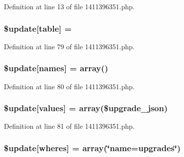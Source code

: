 Definition at line 13 of file 1411396351.\+php.

\subsubsection[{\texorpdfstring{\$update}{$update}}]{\setlength{\rightskip}{0pt plus 5cm}\${\bf update}\mbox{[}\textquotesingle{}table\textquotesingle{}\mbox{]} = \textquotesingle{}}\hypertarget{1411396351_8php_aee7ba5985ddf023a93862ab77e9718f9}{}\label{1411396351_8php_aee7ba5985ddf023a93862ab77e9718f9}


Definition at line 79 of file 1411396351.\+php.

\subsubsection[{\texorpdfstring{\$update}{$update}}]{\setlength{\rightskip}{0pt plus 5cm}\${\bf update}\mbox{[}\textquotesingle{}names\textquotesingle{}\mbox{]} = array(\textquotesingle{})}\hypertarget{1411396351_8php_abcf5ad2e4fef35de04bef0168cc91ddc}{}\label{1411396351_8php_abcf5ad2e4fef35de04bef0168cc91ddc}


Definition at line 80 of file 1411396351.\+php.

\subsubsection[{\texorpdfstring{\$update}{$update}}]{\setlength{\rightskip}{0pt plus 5cm}\${\bf update}\mbox{[}\textquotesingle{}values\textquotesingle{}\mbox{]} = array(\$upgrade\+\_\+json)}\hypertarget{1411396351_8php_ac82a75b4c6df37380ff77c88f041785e}{}\label{1411396351_8php_ac82a75b4c6df37380ff77c88f041785e}


Definition at line 81 of file 1411396351.\+php.

\subsubsection[{\texorpdfstring{\$update}{$update}}]{\setlength{\rightskip}{0pt plus 5cm}\${\bf update}\mbox{[}\textquotesingle{}wheres\textquotesingle{}\mbox{]} = array(\char`\"{}name=\textquotesingle{}upgrades\textquotesingle{}\char`\"{})}\hypertarget{1411396351_8php_aacde4479a904b32d0f24dea4e01f148c}{}\label{1411396351_8php_aacde4479a904b32d0f24dea4e01f148c}


